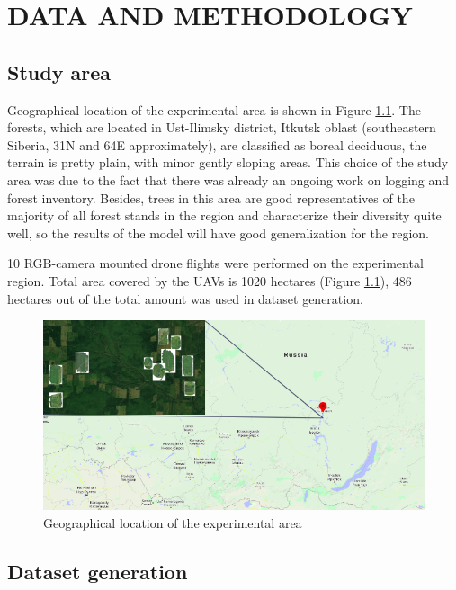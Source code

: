\renewcommand\chaptername{}
\chapter{DATA AND METHODOLOGY}

\section{Study area}

Geographical location of the experimental area is shown in Figure \ref{StudyArea}. The forests, which are located in Ust-Ilimsky district, Itkutsk oblast (southeastern Siberia, 31N and 64E approximately), are classified as boreal deciduous, the terrain is pretty plain, with minor gently sloping areas. 
This choice of the study area was due to the fact that there was already an ongoing work on logging and forest inventory. Besides, trees in this area are good representatives of the majority of all forest stands in the region and characterize their diversity quite well, so the results of the model will have good generalization for the region. 

10 RGB-camera mounted drone flights were performed on the experimental region. Total area covered by the \gls{UAV}s is 1020 hectares (Figure \ref{StudyArea}), 486 hectares out of the total amount was used in dataset generation.\\

\begin{figure}[ht]
\centering
\includegraphics[scale=0.7]{images/StudyArea.png}
\caption{Geographical location of the experimental area}
\label{StudyArea}
\end{figure}

\section{Dataset generation}

